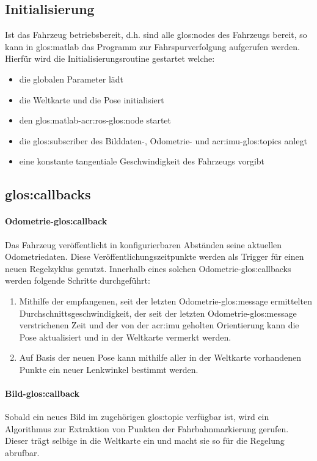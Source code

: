 \subsection{Initialisierung}
Ist das Fahrzeug betriebsbereit, d.h. sind alle \glspl{glos:node} des Fahrzeugs bereit, so kann in \gls{glos:matlab} das Programm zur Fahrspurverfolgung aufgerufen werden. Hierfür wird die Initialisierungsroutine gestartet welche:
\begin{itemize}
\item die globalen Parameter lädt
\item die Weltkarte und die Pose initialisiert
\item den \gls{glos:matlab}-\gls{acr:ros}-\gls{glos:node} startet
\item die \gls{glos:subscriber} des Bilddaten-, Odometrie- und \gls{acr:imu}-\glspl{glos:topic} anlegt
\item eine konstante tangentiale Geschwindigkeit des Fahrzeugs vorgibt 
\end{itemize}

\subsection{\glspl{glos:callback}}
\paragraph{Odometrie-\gls{glos:callback}}
Das Fahrzeug veröffentlicht in konfigurierbaren Abständen seine aktuellen Odometriedaten. Diese Veröffentlichungszeitpunkte werden als Trigger für einen neuen Regelzyklus genutzt. Innerhalb eines solchen Odometrie-\gls{glos:callback}s werden folgende Schritte durchgeführt:
\begin{enumerate}
\item Mithilfe der empfangenen, seit der letzten Odometrie-\gls{glos:message} ermittelten Durchschnittsgeschwindigkeit, der seit der letzten Odometrie-\gls{glos:message} verstrichenen Zeit und der von der \gls{acr:imu} geholten Orientierung kann die Pose aktualisiert und in der Weltkarte vermerkt werden.
\item Auf Basis der neuen Pose kann mithilfe aller in der Weltkarte vorhandenen Punkte ein neuer Lenkwinkel bestimmt werden.
\end{enumerate}
\paragraph{Bild-\gls{glos:callback}}
Sobald ein neues Bild im zugehörigen \gls{glos:topic} verfügbar ist, wird ein  Algorithmus zur Extraktion von Punkten der Fahrbahnmarkierung gerufen. Dieser trägt selbige in die Weltkarte ein und macht sie so für die Regelung abrufbar.
